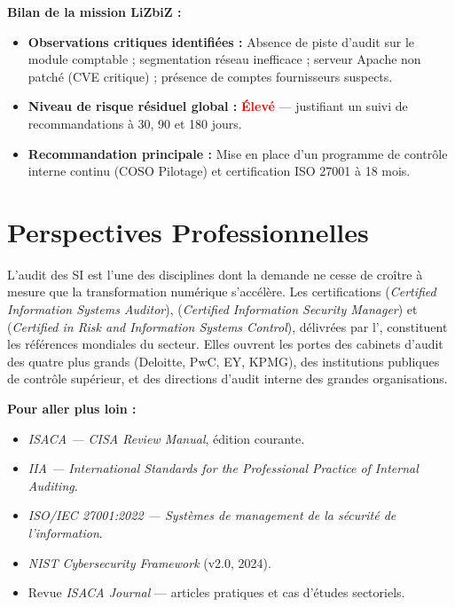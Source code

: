 \begin{boxlizbiz}
\textbf{Bilan de la mission LiZbiZ :}
\begin{itemize}
    \item \textbf{Observations critiques identifiées :} Absence de piste d'audit sur le module comptable ; segmentation réseau inefficace ; serveur Apache non patché (CVE critique) ; présence de comptes fournisseurs suspects.
    \item \textbf{Niveau de risque résiduel global :} \textcolor{red}{\textbf{Élevé}} — justifiant un suivi de recommandations à 30, 90 et 180 jours.
    \item \textbf{Recommandation principale :} Mise en place d'un programme de contrôle interne continu (COSO Pilotage) et certification ISO 27001 à 18 mois.
\end{itemize}
\end{boxlizbiz}

\section*{Perspectives Professionnelles}

L'audit des SI est l'une des disciplines dont la demande ne cesse de croître à mesure que la transformation numérique s'accélère. Les certifications  (\textit{Certified Information Systems Auditor}),  (\textit{Certified Information Security Manager}) et  (\textit{Certified in Risk and Information Systems Control}), délivrées par l', constituent les références mondiales du secteur. Elles ouvrent les portes des cabinets d'audit des quatre plus grands (Deloitte, PwC, EY, KPMG), des institutions publiques de contrôle supérieur, et des directions d'audit interne des grandes organisations.

\begin{boxinfo}
\textbf{Pour aller plus loin :}
\begin{itemize}
    \item \textit{ISACA — CISA Review Manual}, édition courante.
    \item \textit{IIA — International Standards for the Professional Practice of Internal Auditing}.
    \item \textit{ISO/IEC 27001:2022 — Systèmes de management de la sécurité de l'information}.
    \item \textit{NIST Cybersecurity Framework} (v2.0, 2024).
    \item Revue \textit{ISACA Journal} — articles pratiques et cas d'études sectoriels.
\end{itemize}
\end{boxinfo}

